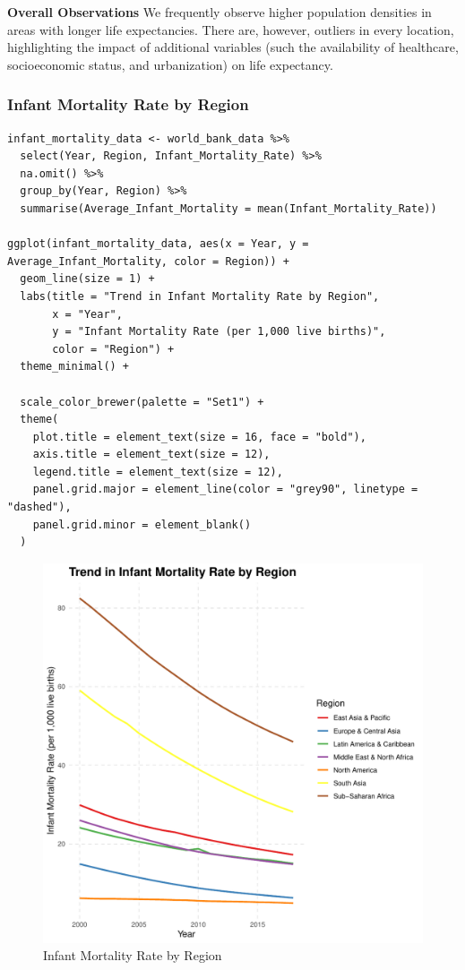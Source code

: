 \documentclass{article}\usepackage[]{graphicx}\usepackage[]{xcolor}
\makeatletter
\def\maxwidth{ %
  \ifdim\Gin@nat@width>\linewidth
    \linewidth
  \else
    \Gin@nat@width
  \fi
}
\newenvironment{knitrout}{}{} %
\makeatother
\begin{document}
\textbf{Overall Observations}
We frequently observe higher population densities in areas with longer life expectancies.
There are, however, outliers in every location, highlighting the impact of additional variables (such the availability of healthcare, socioeconomic status, and urbanization) on life expectancy.

\subsubsection{Infant Mortality Rate by Region }
\begin{lstlisting}
infant_mortality_data <- world_bank_data %>%
  select(Year, Region, Infant_Mortality_Rate) %>%
  na.omit() %>%
  group_by(Year, Region) %>%
  summarise(Average_Infant_Mortality = mean(Infant_Mortality_Rate))

ggplot(infant_mortality_data, aes(x = Year, y = Average_Infant_Mortality, color = Region)) +
  geom_line(size = 1) +  
  labs(title = "Trend in Infant Mortality Rate by Region",
       x = "Year",
       y = "Infant Mortality Rate (per 1,000 live births)",
       color = "Region") +
  theme_minimal() +
  
  scale_color_brewer(palette = "Set1") +  
  theme(
    plot.title = element_text(size = 16, face = "bold"),  
    axis.title = element_text(size = 12),                
    legend.title = element_text(size = 12),              
    panel.grid.major = element_line(color = "grey90", linetype = "dashed"),   
    panel.grid.minor = element_blank()                   
  ) 

\end{lstlisting}
\newpage
\begin{figure}[h!]
\centering
\begin{knitrout}
\color{fgcolor}
\includegraphics[width=\maxwidth]{figure/unnamed-chunk-9-1} 
\end{knitrout}
\caption{Infant Mortality Rate by Region}
\label{fig}
\end{figure}
\end{document}
